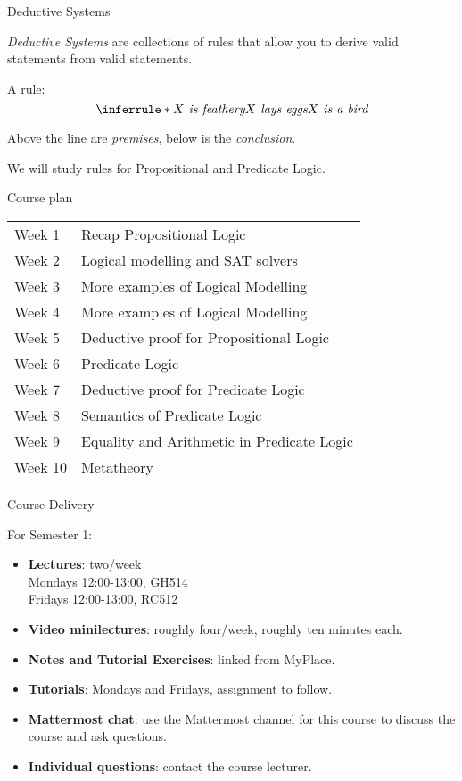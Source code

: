 \documentclass[xetex,aspectratio=169,14pt,hyperref={pdfpagelabels=true,pdflang={en-GB}}]{beamer}
\begin{document}
\begin{frame}
  {Deductive Systems}

  \emph{Deductive Systems} are collections of rules that allow you to
  derive valid statements from valid statements.

  \bigskip

  A rule:
  \begin{displaymath}
    \inferrule*
    {X\textit{ is feathery} \\ X\textit{ lays eggs}}
    {X\textit{ is a bird}}
  \end{displaymath}

  Above the line are \emph{premises}, below is the \emph{conclusion}.

  \bigskip

  We will study rules for Propositional and Predicate Logic.
\end{frame}

\begin{frame}
  {Course plan}

  \begin{tabular}{ll}
    Week 1 & Recap Propositional Logic \\
    Week 2 & Logical modelling and SAT solvers \\
    Week 3 & More examples of Logical Modelling \\
    Week 4 & More examples of Logical Modelling \\
    Week 5 & Deductive proof for Propositional Logic \\
    Week 6 & Predicate Logic \\
    Week 7 & Deductive proof for Predicate Logic \\
    Week 8 & Semantics of Predicate Logic \\
    Week 9 & Equality and Arithmetic in Predicate Logic \\
    Week 10 & Metatheory \\
  \end{tabular}
\end{frame}

\begin{frame}
  {Course Delivery}

  For Semester 1:
  \begin{itemize}
  \item \textbf{Lectures}: two/week \\
    Mondays 12:00-13:00, GH514 \\
    Fridays 12:00-13:00, RC512
  \item \textbf{Video minilectures}: roughly four/week, roughly ten minutes each.
  \item \textbf{Notes and Tutorial Exercises}: linked from MyPlace.
  \item \textbf{Tutorials}: Mondays and Fridays, assignment to follow.
  \item \textbf{Mattermost chat}: use the Mattermost channel for this
    course to discuss the course and ask questions.
  \item \textbf{Individual questions}: contact the course lecturer.
  \end{itemize}
\end{frame}
\end{document}
